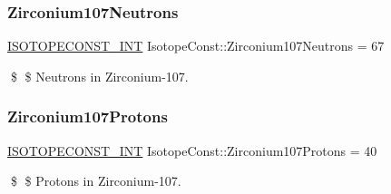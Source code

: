 \subsubsection{\texorpdfstring{Zirconium107\+Neutrons}{Zirconium107Neutrons}}
{\footnotesize\ttfamily \mbox{\hyperlink{group___isotope_const-_macros_ga5f18360b3e99483a35c32d789e62621c}{I\+S\+O\+T\+O\+P\+E\+C\+O\+N\+S\+T\+\_\+\+I\+NT}} Isotope\+Const\+::\+Zirconium107\+Neutrons = 67}

\$ \$ Neutrons in Zirconium-\/107. \mbox{\label{group___isotope_const-_zirconium-_zr107_ga5a65ac01e34ad0229af992901fc19bed}} 
\subsubsection{\texorpdfstring{Zirconium107\+Protons}{Zirconium107Protons}}
{\footnotesize\ttfamily \mbox{\hyperlink{group___isotope_const-_macros_ga5f18360b3e99483a35c32d789e62621c}{I\+S\+O\+T\+O\+P\+E\+C\+O\+N\+S\+T\+\_\+\+I\+NT}} Isotope\+Const\+::\+Zirconium107\+Protons = 40}

\$ \$ Protons in Zirconium-\/107. 